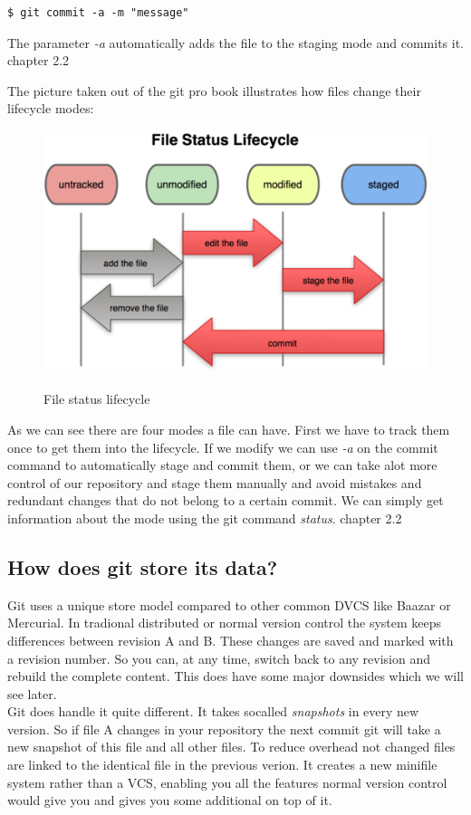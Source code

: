 \begin{lstlisting}
$ git commit -a -m "message"
\end{lstlisting}

The parameter \emph{-a} automatically adds the file to the staging mode and
commits it. \cite{gitpro2009} chapter 2.2

The picture taken out of the git pro book illustrates how files change their
lifecycle modes:

\begin{figure}[h]
  \includegraphics{img/file_status_lifecycle}
  \caption{File status lifecycle}
  \label{fig:File status lifecycle}
  \cite{piclifecycle}
\end{figure}

As we can see there are four modes a file can have. First we have to track them
once to get them into the lifecycle. If we modify we can use \emph{-a} on the
commit command to automatically stage and commit them, or we can take alot more
control of our repository and stage them manually and avoid mistakes and
redundant changes that do not belong to a certain commit.
We can simply get information about the mode using the git command
\emph{status}. \cite{gitpro2009} chapter 2.2

\subsection{How does git store its data?}
Git uses a unique store model compared to other common DVCS like Baazar or Mercurial. 
In tradional distributed or normal version control the system keeps differences between revision A and B. 
These changes are saved and marked with a revision number. 
So you can, at any time, switch back to any revision and rebuild the complete content.
This does have some major downsides which we will see later. \\
Git does handle it quite different. It takes socalled \emph{snapshots} in every
new version. So if file A changes in your repository the next commit git will take a new snapshot of this file and all other files. 
To reduce overhead not changed files are linked to the identical file in the previous verion. 
It creates a new minifile system rather than a VCS, enabling you all the features normal version 
control would give you and gives you some additional on top of it. \cite{gitpro2009} 

